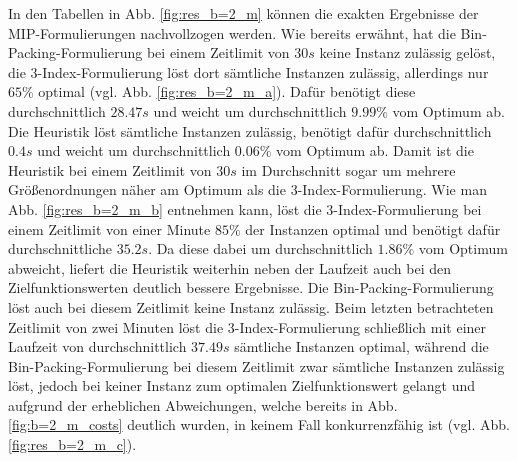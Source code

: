 In den Tabellen in Abb. \ref{fig:res_b=2_m} können die exakten Ergebnisse der MIP-Formulierungen nachvollzogen werden.
Wie bereits erwähnt, hat die Bin-Packing-Formulierung bei einem Zeitlimit von $30s$ keine Instanz zulässig gelöst, die 3-Index-Formulierung löst dort sämtliche Instanzen zulässig, allerdings nur $65 \%$ optimal (vgl. Abb. \ref{fig:res_b=2_m_a}). Dafür benötigt diese durchschnittlich $28.47s$ und weicht um durchschnittlich $9.99 \%$ vom Optimum ab.
Die Heuristik löst sämtliche Instanzen zulässig, benötigt dafür durchschnittlich $0.4s$ und weicht um durchschnittlich $0.06 \%$ vom Optimum ab. Damit ist die Heuristik bei einem Zeitlimit von $30s$ im Durchschnitt sogar um mehrere Größenordnungen näher am Optimum als die 3-Index-Formulierung. Wie man Abb. \ref{fig:res_b=2_m_b} entnehmen kann, löst die 3-Index-Formulierung bei einem Zeitlimit von einer Minute $85 \%$ der Instanzen optimal und benötigt dafür durchschnittliche $35.2s$. Da diese dabei um durchschnittlich $1.86 \%$ vom Optimum abweicht, liefert die Heuristik weiterhin neben der Laufzeit auch bei den Zielfunktionswerten deutlich bessere Ergebnisse. Die Bin-Packing-Formulierung löst auch bei diesem Zeitlimit keine Instanz zulässig. Beim letzten betrachteten Zeitlimit von zwei Minuten löst die 3-Index-Formulierung schließlich mit einer Laufzeit von durchschnittlich $37.49s$ sämtliche Instanzen optimal, während die Bin-Packing-Formulierung bei diesem Zeitlimit zwar sämtliche Instanzen zulässig löst, jedoch bei keiner Instanz zum optimalen Zielfunktionswert gelangt und aufgrund der erheblichen Abweichungen, welche bereits in Abb. \ref{fig:b=2_m_costs} deutlich wurden, in keinem Fall konkurrenzfähig ist (vgl. Abb. \ref{fig:res_b=2_m_c}).

